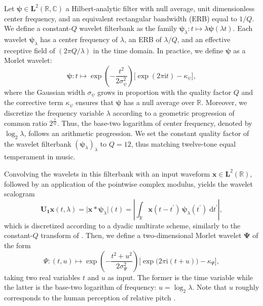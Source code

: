 \documentclass{bmcart}
\begin{document}
Let $\boldsymbol{\psi} \in \mathbf{L}^2(\mathbb{R}, \mathbb{C})$ a Hilbert-analytic filter with null average, unit dimensionless center frequency, and an equivalent rectangular bandwidth (ERB) equal to $1/Q$.
We define a constant-$Q$ wavelet filterbank as the family $\boldsymbol{\psi}_{\lambda} : t \mapsto \lambda \boldsymbol{\psi}(\lambda t)$.
Each wavelet $\boldsymbol{\psi}_{\lambda}$ has a center frequency of $\lambda$, an ERB of $\lambda/Q$, and an effective receptive field of $(2\pi Q/\lambda)$ in the time domain.
In practice, we define $\boldsymbol{\psi}$ as a Morlet wavelet:
\begin{equation}
\boldsymbol{\psi}:t \longmapsto \exp\left(-\dfrac{t^2}{2\sigma_{\psi}^2}\right)
\big[ \exp\left(2\pi \mathrm{i}t\right) - \kappa_{\psi} \big],
\label{eq:psi}
\end{equation}
where the Gaussian width $\sigma_{\psi}$ grows in proportion with the quality factor $Q$ and the corrective term $\kappa_{\psi}$ ensures that $\boldsymbol{\psi}$ has a null average over $\mathbb{R}$.
Moreover, we discretize the frequency variable $\lambda$ according to a geometric progression of common ratio $2^{\frac{1}{Q}}$.
Thus, the base-two logarithm of center frequency, denoted by $\log_2 \lambda$, follows an arithmetic progression.
We set the constant quality factor of the wavelet filterbank $(\boldsymbol{\psi}_\lambda)_\lambda$ to $Q=12$, thus matching twelve-tone equal temperament in music.

Convolving the wavelets in this filterbank with an input waveform $\boldsymbol{x}\in\mathbf{L}^2(\mathbb{R})$, followed by an application of the pointwise complex modulus, yields the wavelet scalogram
\begin{equation}
\mathbf{U_1}\boldsymbol{x}(t,\lambda) =
\big\vert
\boldsymbol{x}
\ast
\boldsymbol{\psi}_{\lambda}
\big\vert(t)
=
\left\vert
\int_{\mathbb{R}}
\boldsymbol{x}(t - t^{\prime})
\,
\boldsymbol{\psi}_{\lambda} (t^{\prime})
\;
\mathrm{d}{t^\prime}
\right\vert,
\label{eq:U1}
\end{equation}
which is discretized according to a dyadic multirate scheme, similarly to the constant-$Q$ transform of \cite{schorkhuber2010smc}.
Then, we define a two-dimensional Morlet wavelet $\boldsymbol{\Psi}$ of the form
\begin{equation}
\Psi : (t, u) \longmapsto
\exp\left(-\dfrac{t^2+u^2}{2\sigma_{\Psi}^2}\right)
\Big[ \exp\big(2\pi \mathrm{i} (t + u)\big) - \kappa_{\Psi} \Big],
\label{eq:Psi}
\end{equation}
taking two real variables $t$ and $u$ as input.
The former is the time variable while the latter is the base-two logarithm of frequency: $u = \log_2 \lambda$.
Note that $u$ roughly corresponds to the human perception of relative pitch \cite{lostanlen2020icassp}.
\end{document}

